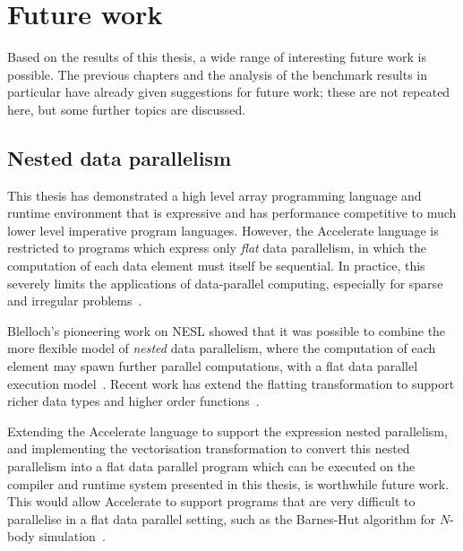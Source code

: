 %
%


\section{Future work}

Based on the results of this thesis, a wide range of interesting future work is
possible. The previous chapters and the analysis of the benchmark results in
particular have already given suggestions for future work; these are not
repeated here, but some further topics are discussed.

\subsection{Nested data parallelism}

This thesis has demonstrated a high level array programming language and runtime
environment that is expressive and has performance competitive to much lower
level imperative program languages. However, the Accelerate language is
restricted to programs which express only \emph{flat} data parallelism, in which
the computation of each data element must itself be sequential. In practice,
this severely limits the applications of data-parallel computing, especially for
sparse and irregular problems~\cite{Prins:1999}.

Blelloch's pioneering work on NESL showed that it was possible to combine the
more flexible model of \emph{nested} data parallelism, where the computation of
each element may spawn further parallel computations, with a flat data parallel
execution model~\cite{Blelloch:1988iu}. Recent work has extend the flatting
transformation to support richer data types and higher order
functions~\cite{Jones:2008uu}.

Extending the Accelerate language to support the expression nested parallelism,
and implementing the vectorisation transformation to convert this nested
parallelism into a flat data parallel program which can be executed on the
compiler and runtime system presented in this thesis, is worthwhile future work.
This would allow Accelerate to support programs that are very difficult to
parallelise in a flat data parallel setting, such as the Barnes-Hut algorithm
for $N$-body simulation~\cite{Barnes:1986}.


